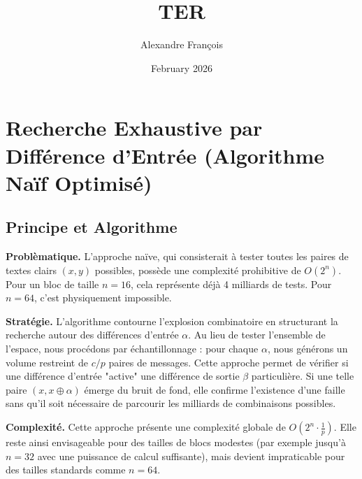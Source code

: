\documentclass{article}
\title{TER}
\author{Alexandre François}
\date{February 2026}
\begin{document}
    \maketitle

    \section{Recherche Exhaustive par Différence d'Entrée (Algorithme Naïf Optimisé)}\label{sec:recherche-exhaustive-par-difference-d'entree-(algorithme-naif-optimise)}

    \subsection{Principe et Algorithme}\label{subsec:principe-et-algorithme}

    \noindent \textbf{Problèmatique.} L'approche naïve, qui consisterait à tester toutes les paires de textes clairs $(x,y)$ possibles, possède une complexité prohibitive de $O(2^n)$. Pour un bloc de taille $n = 16$, cela représente déjà 4 milliards de tests. Pour $n = 64$, c'est physiquement impossible.

    \vspace{0.2cm}

    \noindent \textbf{Stratégie.} L'algorithme contourne l'explosion combinatoire en structurant la recherche autour des différences d'entrée $\alpha$. Au lieu de tester l'ensemble de l'espace, nous procédons par échantillonnage : pour chaque $\alpha$, nous générons un volume restreint de $c/p$ paires de messages. Cette approche permet de vérifier si une différence d'entrée "active" une différence de sortie $\beta$ particulière. Si une telle paire $(x, x \oplus \alpha)$ émerge du bruit de fond, elle confirme l'existence d'une faille sans qu'il soit nécessaire de parcourir les milliards de combinaisons possibles.

    \vspace{0.2cm}

    \noindent \textbf{Complexité.} Cette approche présente une complexité globale de $O(2^n \cdot \frac{1}{p})$. Elle reste ainsi envisageable pour des tailles de blocs modestes (par exemple jusqu'à $n = 32$ avec une puissance de calcul suffisante), mais devient impraticable pour des tailles standards comme $n = 64$.
\end{document}
